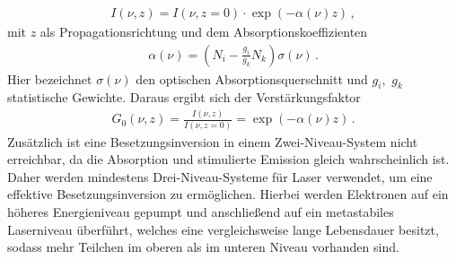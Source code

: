 \begin{align}
    I(\nu, z) = I(\nu, z=0)\cdot \exp(- \alpha(\nu)z)\,, \label{eqn:IntensitaetVerstaerkung}
\end{align}
mit $z$ als Propagationsrichtung und dem Absorptionskoeffizienten 
\begin{align}
    \alpha(\nu) = \left(N_i - \frac{g_i}{g_k} N_k \right)\sigma(\nu)\,. \label{eqn:Absorptionskoeffizienten}
\end{align}
Hier bezeichnet $\sigma(\nu)$ den optischen Absorptionsquerschnitt und $g_i,\,\,g_k$ statistische Gewichte.
Daraus ergibt sich der Verstärkungsfaktor 
\begin{align}
    G_0(\nu, z) = \frac{I(\nu, z)}{I(\nu, z=0)}= \exp(-\alpha(\nu) z)\,. \label{eqn:Verstaerkungsfaktor}
\end{align}
Zusätzlich ist eine Besetzungsinversion in einem  Zwei-Niveau-System nicht erreichbar, da die Absorption und stimulierte Emission gleich wahrscheinlich ist. Daher werden mindestens Drei-Niveau-Systeme für Laser verwendet, um eine effektive Besetzungsinversion zu ermöglichen. Hierbei werden Elektronen auf ein höheres Energieniveau gepumpt und anschließend auf ein metastabiles Laserniveau überführt, welches eine vergleichsweise lange Lebensdauer besitzt, sodass mehr Teilchen im oberen als im unteren Niveau vorhanden sind. \cite{laserspektroskopie} \cite{laser}

